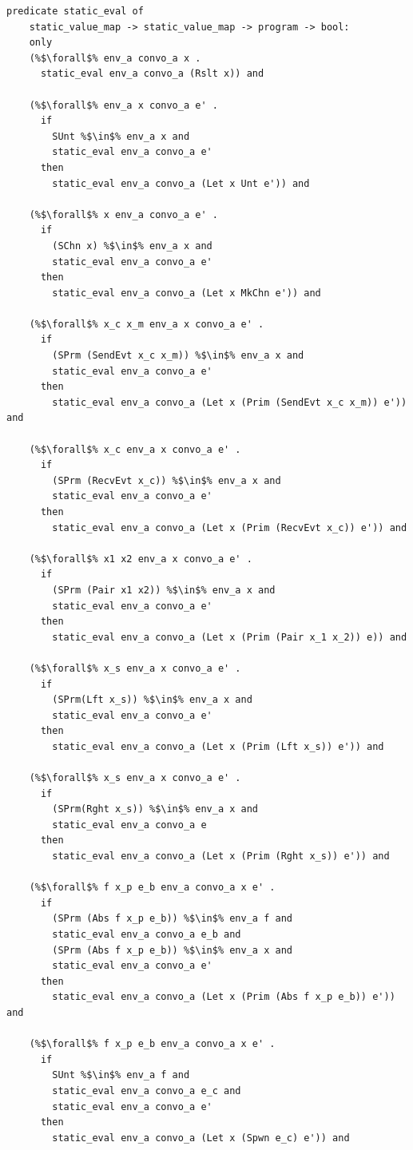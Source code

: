 \documentclass{article}
\begin{document}
\begin{lstlisting}[language=logic, escapechar=\%]
  predicate static_eval of
    static_value_map -> static_value_map -> program -> bool:
    only
    (%$\forall$% env_a convo_a x .
      static_eval env_a convo_a (Rslt x)) and

    (%$\forall$% env_a x convo_a e' .
      if 
        SUnt %$\in$% env_a x and
        static_eval env_a convo_a e'
      then
        static_eval env_a convo_a (Let x Unt e')) and

    (%$\forall$% x env_a convo_a e' .
      if 
        (SChn x) %$\in$% env_a x and
        static_eval env_a convo_a e'
      then  
        static_eval env_a convo_a (Let x MkChn e')) and

    (%$\forall$% x_c x_m env_a x convo_a e' .
      if
        (SPrm (SendEvt x_c x_m)) %$\in$% env_a x and
        static_eval env_a convo_a e' 
      then
        static_eval env_a convo_a (Let x (Prim (SendEvt x_c x_m)) e')) and

    (%$\forall$% x_c env_a x convo_a e' . 
      if 
        (SPrm (RecvEvt x_c)) %$\in$% env_a x and
        static_eval env_a convo_a e'
      then
        static_eval env_a convo_a (Let x (Prim (RecvEvt x_c)) e')) and

    (%$\forall$% x1 x2 env_a x convo_a e' .
      if
        (SPrm (Pair x1 x2)) %$\in$% env_a x and
        static_eval env_a convo_a e'
      then
        static_eval env_a convo_a (Let x (Prim (Pair x_1 x_2)) e)) and

    (%$\forall$% x_s env_a x convo_a e' .
      if
        (SPrm(Lft x_s)) %$\in$% env_a x and
        static_eval env_a convo_a e' 
      then
        static_eval env_a convo_a (Let x (Prim (Lft x_s)) e')) and

    (%$\forall$% x_s env_a x convo_a e' .
      if
        (SPrm(Rght x_s)) %$\in$% env_a x and
        static_eval env_a convo_a e
      then
        static_eval env_a convo_a (Let x (Prim (Rght x_s)) e')) and

    (%$\forall$% f x_p e_b env_a convo_a x e' .
      if
        (SPrm (Abs f x_p e_b)) %$\in$% env_a f and
        static_eval env_a convo_a e_b and
        (SPrm (Abs f x_p e_b)) %$\in$% env_a x and
        static_eval env_a convo_a e'
      then
        static_eval env_a convo_a (Let x (Prim (Abs f x_p e_b)) e')) and

    (%$\forall$% f x_p e_b env_a convo_a x e' .
      if
        SUnt %$\in$% env_a f and
        static_eval env_a convo_a e_c and
        static_eval env_a convo_a e'
      then
        static_eval env_a convo_a (Let x (Spwn e_c) e')) and


\end{lstlisting}
\end{document}
